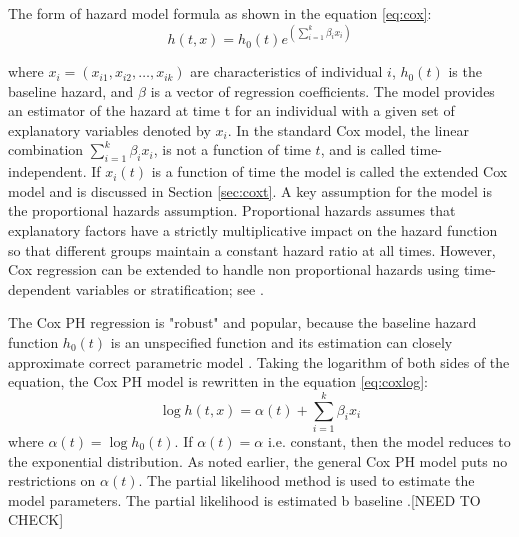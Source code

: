 \documentclass[12pt,letterpaper]{article}
\begin{document}
The form of hazard model formula as shown in the equation \ref{eq:cox}:
\begin{equation}
	\label{eq:cox}
	h(t,x)=h_0(t)e^{(\sum_{i=1}^{k}\beta_ix_i)}
\end{equation}

where $x_i=(x_{i1}, x_{i2}, \ldots, x_{ik})$ are characteristics of individual $i$, $h_0(t)$ is the baseline hazard, and $\beta$  is a vector of regression coefficients.
The model provides an estimator of the hazard at time t for an individual with a given set of explanatory variables denoted by $x_i$.  In the standard Cox model, the linear combination $\sum_{i=1}^{k}\beta_i x_i$, is not a function of time $t$, and is called time-independent.  If $x_i(t)$ is a function of time the model is called the extended Cox model and is discussed in Section \ref{sec:coxt}. A key assumption for the model is the proportional hazards assumption. Proportional hazards assumes that explanatory factors have a strictly multiplicative impact on the hazard function so that different groups maintain a constant hazard ratio at all times. However, Cox regression can be extended to handle non proportional hazards using time-dependent variables or stratification; see \cite{kleinMosch2003}.

The Cox PH regression is "robust" and popular, because the baseline hazard function $h_0 (t)$ is an unspecified function and its estimation can closely approximate correct parametric model \citep{kleinbaum1998}. Taking the logarithm of both sides of the equation, the Cox PH model is rewritten in the equation \ref{eq:coxlog}:
\begin{equation}
	\label{eq:coxlog}
	\log{h(t,x)}=\alpha(t)+\sum_{i=1}^{k}\beta_ix_i
\end{equation}
where $\alpha(t)=\log{h_0(t)}$. If $\alpha(t)=\alpha$ i.e. constant, then the model reduces to the exponential distribution. As noted earlier, the general Cox PH model puts no restrictions on $\alpha(t)$.  The partial likelihood method is used to estimate the model parameters. The partial likelihood is estimated b baseline \citep{allison1995}.[NEED TO CHECK]
\end{document}
